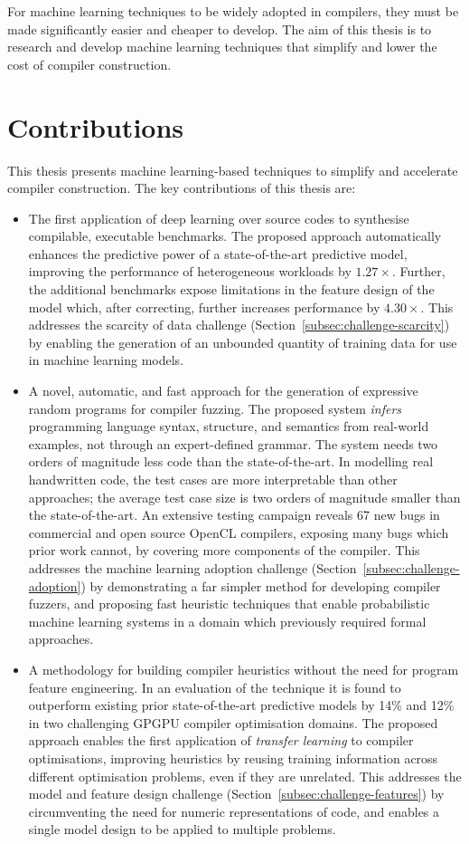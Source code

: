 For machine learning techniques to be widely adopted in compilers, they must be made significantly easier and cheaper to develop. The aim of this thesis is to research and develop machine learning techniques that simplify and lower the cost of compiler construction.


\newpage
\section{Contributions}

This thesis presents machine learning-based techniques to simplify and accelerate compiler construction. The key contributions of this thesis are:

\begin{itemize}
  \item The first application of deep learning over source codes to synthesise compilable, executable benchmarks. The proposed approach automatically enhances the predictive power of a state-of-the-art predictive model, improving the performance of heterogeneous workloads by $1.27\times$. Further, the additional benchmarks expose limitations in the feature design of the model which, after correcting, further increases performance by $4.30\times$. This addresses the scarcity of data challenge (Section~\ref{subsec:challenge-scarcity}) by enabling the generation of an unbounded quantity of training data for use in machine learning models.
  \item A novel, automatic, and fast approach for the generation of expressive random programs for compiler fuzzing. The proposed system \emph{infers} programming language syntax, structure, and semantics from real-world examples, not through an expert-defined grammar. The system needs two orders of magnitude less code than the state-of-the-art. In modelling real handwritten code, the test cases are more interpretable than other approaches; the average test case size is two orders of magnitude smaller than the state-of-the-art. An extensive testing campaign reveals 67 new bugs in commercial and open source OpenCL compilers, exposing many bugs which prior work cannot, by covering more components of the compiler. This addresses the machine learning adoption challenge (Section~\ref{subsec:challenge-adoption}) by demonstrating a far simpler method for developing compiler fuzzers, and proposing fast heuristic techniques that enable probabilistic machine learning systems in a domain which previously required formal approaches.
	\item A methodology for building compiler heuristics without the need for program feature engineering. In an evaluation of the technique it is found to outperform existing prior  state-of-the-art predictive models by 14\% and 12\% in two challenging GPGPU compiler optimisation domains. The proposed approach enables the first application of \emph{transfer learning} to compiler optimisations, improving heuristics by reusing training information across different optimisation problems, even if they are unrelated. This addresses the model and feature design challenge (Section~\ref{subsec:challenge-features}) by circumventing the need for numeric representations of code, and enables a single model design to be applied to multiple problems.

\end{itemize}
